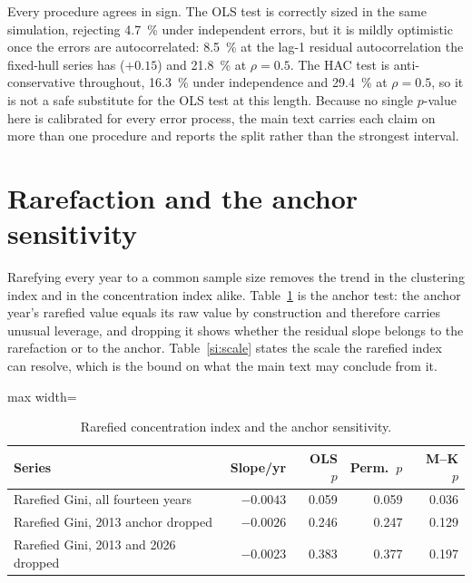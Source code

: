 \documentclass[fleqn,10pt]{wlpeerj}
\begin{document}
\noindent Every procedure agrees in sign. The OLS test is correctly sized in the same
simulation, rejecting \SI{4.7}{\percent} under independent errors, but it is mildly optimistic
once the errors are autocorrelated: \SI{8.5}{\percent} at the lag-1 residual autocorrelation the
fixed-hull series has ($+0.15$) and \SI{21.8}{\percent} at $\rho = 0.5$. The HAC test is
anti-conservative throughout, \SI{16.3}{\percent} under independence and \SI{29.4}{\percent} at
$\rho = 0.5$, so it is not a safe substitute for the OLS test at this length. Because no single $p$-value here is calibrated for every error process, the main
text carries each claim on more than one procedure and reports the split rather than the
strongest interval.

\section{Rarefaction and the anchor sensitivity}
\label{si:rarefy}

Rarefying every year to a common sample size removes the trend in the clustering index and in
the concentration index alike. Table~\ref{si:anchor} is the anchor test: the anchor year's
rarefied value equals its raw value by construction and therefore carries unusual leverage, and
dropping it shows whether the residual slope belongs to the rarefaction or to the anchor.
Table~\ref{si:scale} states the scale the rarefied index can resolve, which is the bound on
what the main text may conclude from it.

\begin{table}[H]
\centering
\caption{Rarefied concentration index and the anchor sensitivity.}
\label{si:anchor}
\small
\begin{adjustbox}{max width=\linewidth}
\begin{tabular}{lrrrr}
\toprule
Series & Slope/yr & OLS $p$ & Perm.\ $p$ & M--K $p$ \\
\midrule
Rarefied Gini, all fourteen years & $-0.0043$ & 0.059 & 0.059 & 0.036 \\
Rarefied Gini, 2013 anchor dropped & $-0.0026$ & 0.246 & 0.247 & 0.129 \\
Rarefied Gini, 2013 and 2026 dropped & $-0.0023$ & 0.383 & 0.377 & 0.197 \\
\bottomrule
\end{tabular}
\end{adjustbox}
\end{table}
\end{document}

